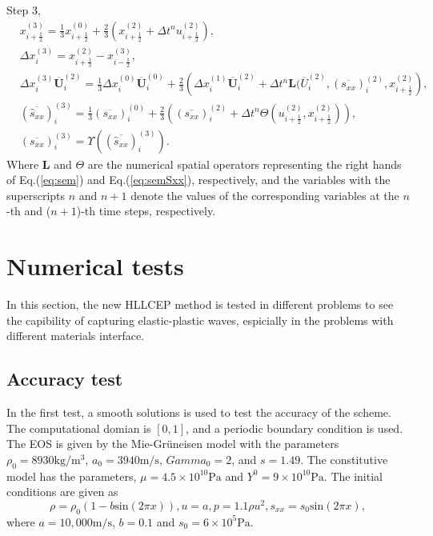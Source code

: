 \documentclass{article}
\numberwithin{equation}{section}
\numberwithin{table}{section}
\begin{document}
Step 3, 
\begin{equation}
  \begin{aligned}
	& x_{i+\frac{1}{2}}^{(3)} = \frac{1}{3} x_{i+\frac{1}{2}}^{(0)}+\frac{2}{3} \left( x_{i+\frac{1}{2}}^{(2)}+\Delta t^n u_{i+\frac{1}{2}}^{(2)}\right),\\
	& \Delta x_i^{(3)} =  x_{i+\frac{1}{3}}^{(2)}- x_{i-\frac{1}{2}}^{(3)},\\
	& \Delta x_i^{(3)} \overline{\bm{U}}_i^{(2)}  = \frac{1}{3} \Delta x_i^{(0)} \overline{\bm{U}}_i^{(0)}+ \frac{2}{3} \left(  \Delta x_i^{(1)} \overline{\bm{U}}_i^{(2)} + \Delta t^n \bm{L}(\overline{U}_i^{(2)}, (\overline{s_{xx}})_i^{(2)}, x_{i+\frac{1}{2}}^{(2)} \right),\\
	& (\overline{\hat{s}_{xx}})_i^{(3)} =\frac{1}{3} (\overline{s_{xx}})_i^{(0)} + \frac{2}{3} \left(  (\overline{s_{xx}})_i^{(2)}+\Delta t^ n \varTheta (u_{i+\frac{1}{2}}^{(2)}, x_{i+\frac{1}{2}}^{(2)})\right),\\
  & (\overline{s_{xx}})_i^{(3)} = \Upsilon((\overline{\hat{s}_{xx}})_i^{(3)}).
\end{aligned}
\end{equation}
Where $\bm{L}$ and $\varTheta$ are the numerical spatial operators representing the right hands of Eq.(\ref{eq:sem}) and Eq.(\ref{eq:semSxx}), respectively, and the variables with the superscripts $n$ and $n+1$ denote the values of the corresponding variables at the $n$-th and ($n+1$)-th time steps, respectively.

\section{Numerical tests}
In this section, the new HLLCEP method  is tested  in different problems to see the capibility of  capturing elastic-plastic waves, espicially in the problems  with different materials interface. 

\subsection{Accuracy test}
In the first test, a smooth solutions is used to test the accuracy of the scheme. The computational domian is $[0,1]$, and a periodic boundary condition is used. The EOS is given by the Mie-Gr\"uneisen model with the parameters $\rho_0 = 8930 \text{kg}/\text{m}^3$, $a_0 = 3940 \text{m}/\text{s}$, $Gamma_0 =2$, and $s=1.49$. The constitutive model has the parameters, $\mu = 4.5\times 10^10 \text{Pa}$ and $Y^0 = 9\times 10^10 \text{Pa}$.  The initial conditions are given as 
\begin{equation}
  \rho = \rho_0(1-b \text{sin}(2\pi x)), u = a, p = 1.1\rho u^2, s_{xx} = s_0 \text{sin}(2\pi x),
\end{equation}
where $a = 10,000\text{m}/\text{s}$, $ b = 0.1$  and  $s_0 = 6\times 10^5 \text{Pa}$.
\end{document}
